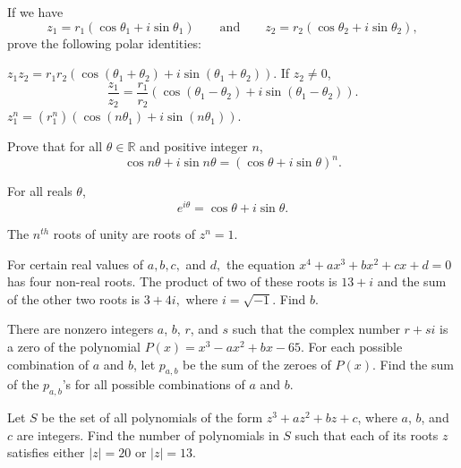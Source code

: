 \begin{theorem}
If we have 
    \[z_1 = r_1(\cos \theta_1 + i\sin\theta_1) \qquad \text{and} \qquad z_2 = r_2(\cos \theta_2 + i\sin\theta_2),\]
    prove the following polar identities:
    \begin{tasks}
        \task $z_1z_2 = r_1r_2(\cos(\theta_1+\theta_2)+i\sin(\theta_1+\theta_2))$.
        \task If $z_2 \neq 0$,
        \[\frac{z_1}{z_2}= \frac{r_1}{r_2}(\cos(\theta_1-\theta_2)+i\sin(\theta_1-\theta_2)).\]
        \task $z_1^n = (r_1^n)\left(\cos(n\theta_1) + i \sin(n\theta_1)\right)$.
    \end{tasks}
\end{theorem}


\begin{theorem}
Prove that for all $\theta \in \mathbb R$ and positive integer $n$,
\[\cos n\theta + i\sin n\theta = (\cos\theta+i\sin\theta)^n.\]
\end{theorem}

\begin{theorem}
    For all reals $\theta$,
    \[e^{i\theta}= \cos\theta+i\sin\theta.\]
\end{theorem}

\begin{definition}
    The $n^{th}$ roots of unity are roots of $z^n = 1$.
\end{definition}

\begin{question}[name={1995 AIME \#5}]
    For certain real values of $a, b, c,$ and $d,$ the equation $x^4+ax^3+bx^2+cx+d=0$ has four non-real roots. The product of two of these roots is $13+i$ and the sum of the other two roots is $3+4i,$ where $i=\sqrt{-1}$. Find $b$.
\end{question}

\begin{question}[name={2013 AIME I \#10}]
    There are nonzero integers $a$, $b$, $r$, and $s$ such that the complex number $r+si$ is a zero of the polynomial $P(x) = x^3 - ax^2 + bx - 65$. For each possible combination of $a$ and $b$, let $p_{a,b}$ be the sum of the zeroes of $P(x)$. Find the sum of the $p_{a,b}$'s for all possible combinations of $a$ and $b$.
\end{question}

\begin{question}[name={2013 AIME II \#12}]
    Let $S$ be the set of all polynomials of the form $z^3+az^2+bz+c$, where $a$, $b$, and $c$ are integers. Find the number of polynomials in $S$ such that each of its roots $z$ satisfies either $\left\lvert z \right\rvert = 20$ or $\left\lvert z \right\rvert = 13$.	
\end{question}


